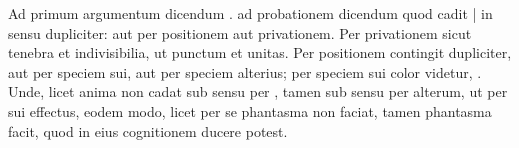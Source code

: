 \medbreak

%
Ad primum argumentum dicendum .  ad probationem dicendum quod  cadit | in sensu dupliciter: aut per positionem aut  privationem. Per privationem sicut tenebra et indivisibilia, ut punctum et unitas. Per positionem contingit dupliciter, aut per speciem sui, aut per speciem alterius; per speciem sui  color videtur, . Unde, licet anima non cadat sub sensu per ,  tamen sub sensu per alterum, ut per sui effectus,  eodem modo, licet per se phantasma non faciat,  tamen phantasma facit, quod in eius cognitionem ducere potest.

